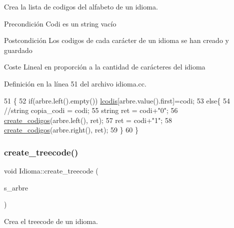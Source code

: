 Crea la lista de codigos del alfabeto de un idioma. 

\begin{DoxyPrecond}{Precondición}
Codi es un string vacío 
\end{DoxyPrecond}
\begin{DoxyPostcond}{Postcondición}
Los codigos de cada carácter de un idioma se han creado y guardado 
\end{DoxyPostcond}
\begin{DoxyParagraph}{Coste}
Lineal en proporción a la cantidad de carácteres del idioma 
\end{DoxyParagraph}


Definición en la línea 51 del archivo idioma.\+cc.


\begin{DoxyCode}
51                                                                                \{
52   \textcolor{keywordflow}{if}(arbre.left().empty()) \hyperlink{class_idioma_ab908f7375f4506b26dd3cd163bc0b8cd}{lcodis}[arbre.value().first]=codi;
53   \textcolor{keywordflow}{else}\{
54     \textcolor{comment}{//string copia\_codi = codi;}
55     \textcolor{keywordtype}{string} ret = codi+\textcolor{stringliteral}{"0"};
56     \hyperlink{class_idioma_a30aeaf1fc288edfcb09a00e47cad834a}{create\_codigos}(arbre.left(), ret);
57     ret = codi+\textcolor{stringliteral}{"1"};
58     \hyperlink{class_idioma_a30aeaf1fc288edfcb09a00e47cad834a}{create\_codigos}(arbre.right(), ret);
59   \}
60 \}
\end{DoxyCode}
\mbox{\label{class_idioma_aa26f926dab1f528a879244f0a1c5f3e5}} 
\subsubsection{\texorpdfstring{create\+\_\+treecode()}{create\_treecode()}}
{\footnotesize\ttfamily void Idioma\+::create\+\_\+treecode (\begin{DoxyParamCaption}\item[{set$<$ Bin\+Tree$<$ pair$<$ string, int $>$$>$$>$ \&}]{s\+\_\+arbre }\end{DoxyParamCaption})\hspace{0.3cm}{\ttfamily [private]}}



Crea el treecode de un idioma. 

